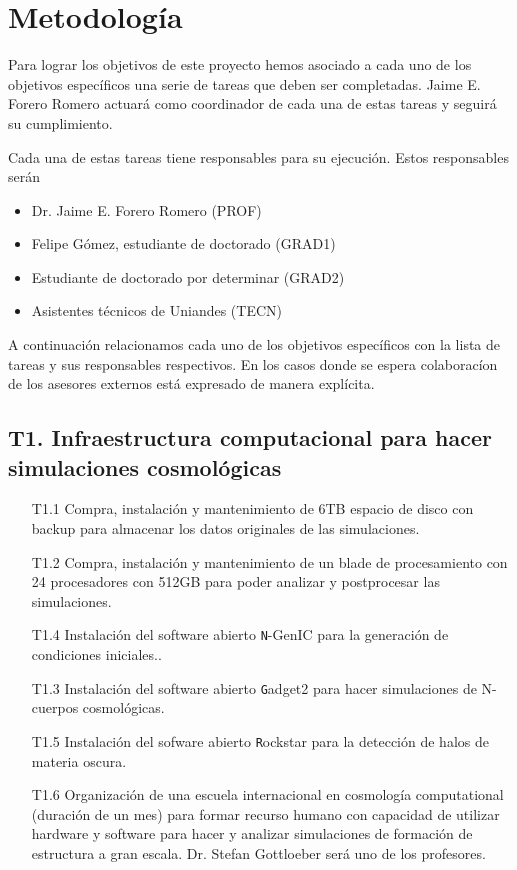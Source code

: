 
\section{Metodolog\'ia}

Para lograr los objetivos de este proyecto hemos asociado a cada uno
de los objetivos espec\'ificos una serie de tareas que deben ser
completadas. Jaime E. Forero Romero actuar\'a como coordinador de cada
una de estas tareas y seguir\'a su cumplimiento. 

Cada una de estas tareas tiene responsables para su ejecuci\'on. Estos
responsables ser\'an

\begin{itemize}
\item Dr. Jaime E. Forero Romero  (PROF)
\item Felipe G\'omez, estudiante de doctorado (GRAD1)
\item Estudiante de doctorado por determinar (GRAD2)
\item Asistentes t\'ecnicos de Uniandes (TECN)
\end{itemize}


A continuaci\'on relacionamos cada uno de los objetivos espec\'ificos
con la lista de tareas y sus responsables respectivos. En los casos
donde se espera colaborac\'ion de los asesores externos est\'a
expresado de manera expl\'icita.

\subsection*{T1. Infraestructura computacional para hacer simulaciones
  cosmol\'ogicas} 
\begin{itemize}
\item[T1.1] Compra, instalaci\'on y mantenimiento de 6TB espacio de disco
  con backup para almacenar los datos originales de las simulaciones.
\item[T1.2] Compra, instalaci\'on y mantenimiento de un blade de
  procesamiento con 24 procesadores con 512GB para poder analizar y
  postprocesar las simulaciones.
\item[T1.4] Instalaci\'on del software abierto {\texttt N-GenIC} para
  la generaci\'on de condiciones iniciales..
\item[T1.3] Instalaci\'on del software abierto {\texttt Gadget2} para
  hacer simulaciones de N-cuerpos cosmol\'ogicas.
\item[T1.5] Instalaci\'on del sofware abierto {\texttt Rockstar} para
  la detecci\'on de halos de materia oscura.
\item[T1.6] Organizaci\'on de una escuela internacional en
  cosmolog\'ia computational (duraci\'on de un mes) para formar
  recurso humano con capacidad de utilizar hardware y software para
  hacer y analizar simulaciones de formaci\'on de estructura a gran
  escala. Dr. Stefan Gottloeber ser\'a uno de los profesores.
\end{itemize}

